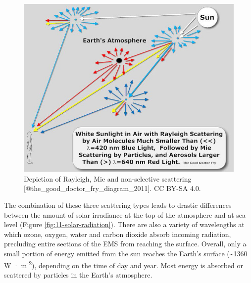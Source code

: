 \documentclass[
]{book}
\begin{document}
\begin{figure}
\includegraphics[width=8.89in]{images/11-scattering} \caption{Depiction of Rayleigh, Mie and non-selective scattering [@the_good_doctor_fry_diagram_2011]. CC BY-SA 4.0.}\label{fig:11-scattering}
\end{figure}

The combination of these three scattering types leads to drastic differences between the amount of solar irradiance at the top of the atmosphere and at sea level (Figure \ref{fig:11-solar-radiation}). There are also a variety of wavelengths at which ozone, oxygen, water and carbon dioxide absorb incoming radiation, precluding entire sections of the EMS from reaching the surface. Overall, only a small portion of energy emitted from the sun reaches the Earth's surface (\textasciitilde1360 W · m\textsuperscript{-2}), depending on the time of day and year. Most energy is absorbed or scattered by particles in the Earth's atmosphere.
\end{document}
